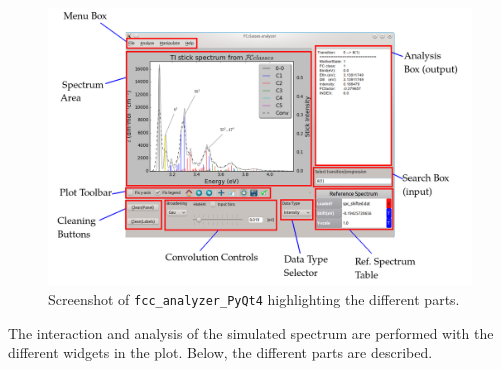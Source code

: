 \documentclass[a4paper,11pt]{article}
\begin{document}
\begin{figure}[h!]
\begin{center}
  \includegraphics[width=15cm]{figs/fcc_analyzer_screeshot.png}
\end{center}
\caption{Screenshot of \texttt{fcc\_analyzer\_PyQt4} highlighting the different parts.}
\end{figure}

The interaction and analysis of the simulated spectrum are performed with the different widgets in the plot. Below, the different parts are described.
\end{document}
